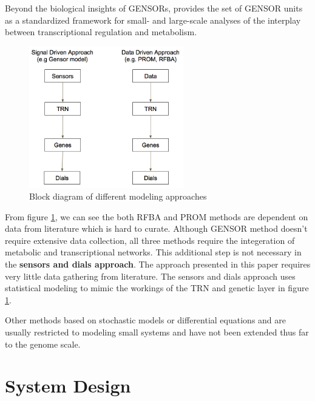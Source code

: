 \documentclass[12pt,chapterheads]{ucsd}
\begin{document}
Beyond the biological insights of GENSORs, \cite{10.3389/fmicb.2017.01466} provides the set of GENSOR units as a standardized framework for small- and large-scale analyses of the interplay between transcriptional regulation and metabolism. 

\begin{figure}[h] 
\centering
\includegraphics[width=0.6\textwidth]{blk_diag}
\caption[Block diagram of different modeling approaches]
{Block diagram of different modeling approaches}
\label{fig:diff_sys}
\end{figure}

From figure \ref{fig:diff_sys}, we can see the both RFBA and PROM methods are dependent on data from literature which is hard to curate. Although GENSOR method doesn't require extensive data collection, all three methods require the integeration of metabolic and transcriptional networks. This additional step is not necessary in the \textbf{sensors and dials approach}. The approach presented in this paper requires very little data gathering from literature. The sensors and dials approach uses statistical modeling to mimic the workings of the TRN and genetic layer in figure \ref{fig:diff_sys}.

Other methods based on stochastic models or differential equations \cite{10.1371/journal.pcbi.1000086} and \cite{10.1371/journal.pcbi.1005489} are usually restricted to modeling small systems and have not been extended thus far to the genome scale.


\chapter{System Design}
\end{document}
